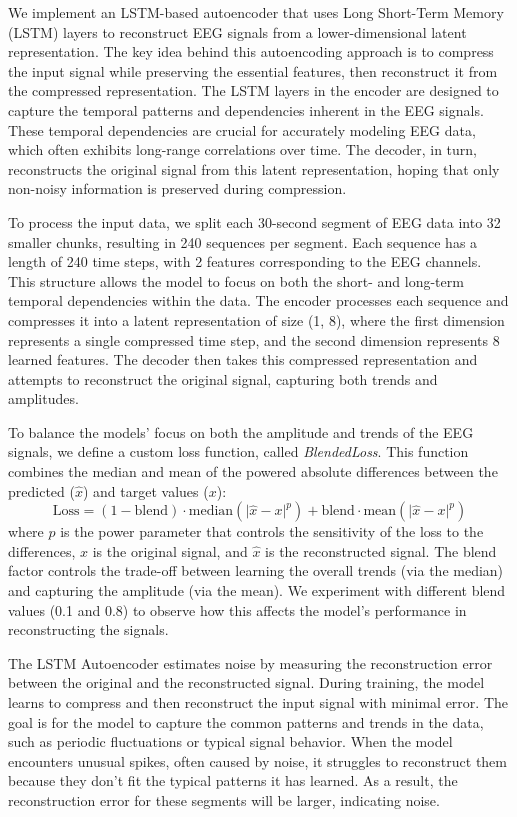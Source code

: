 We implement an LSTM-based autoencoder that uses Long Short-Term Memory (LSTM) layers to reconstruct EEG signals from a lower-dimensional latent representation. The key idea behind this autoencoding approach is to compress the input signal while preserving the essential features, then reconstruct it from the compressed representation. The LSTM layers in the encoder are designed to capture the temporal patterns and dependencies inherent in the EEG signals. These temporal dependencies are crucial for accurately modeling EEG data, which often exhibits long-range correlations over time. The decoder, in turn, reconstructs the original signal from this latent representation, hoping that only non-noisy information is preserved during compression.

To process the input data, we split each 30-second segment of EEG data into 32 smaller chunks, resulting in 240 sequences per segment. Each sequence has a length of 240 time steps, with 2 features corresponding to the EEG channels. This structure allows the model to focus on both the short- and long-term temporal dependencies within the data. The encoder processes each sequence and compresses it into a latent representation of size (1, 8), where the first dimension represents a single compressed time step, and the second dimension represents 8 learned features. The decoder then takes this compressed representation and attempts to reconstruct the original signal, capturing both trends and amplitudes.

To balance the models' focus on both the amplitude and trends of the EEG signals, we define a custom loss function, called \emph{BlendedLoss}. This function combines the median and mean of the powered absolute differences between the predicted ($\hat{x}$) and target values ($x$):
%
\begin{equation}
\text{Loss} = (1 - \text{blend}) \cdot \text{median}(\lvert \hat{x} - x \rvert^p) + \text{blend} \cdot \text{mean}(\lvert \hat{x} - x \rvert^p)
\label{eq:blended_loss}
\end{equation}
%
where $p$ is the power parameter that controls the sensitivity of the loss to the differences, $x$ is the original signal, and $\hat{x}$ is the reconstructed signal. The blend factor controls the trade-off between learning the overall trends (via the median) and capturing the amplitude (via the mean). We experiment with different blend values (0.1 and 0.8) to observe how this affects the model’s performance in reconstructing the signals.

The LSTM Autoencoder estimates noise by measuring the reconstruction error between the original and the reconstructed signal. During training, the model learns to compress and then reconstruct the input signal with minimal error. The goal is for the model to capture the common patterns and trends in the data, such as periodic fluctuations or typical signal behavior. When the model encounters unusual spikes, often caused by noise, it struggles to reconstruct them because they don't fit the typical patterns it has learned. As a result, the reconstruction error for these segments will be larger, indicating noise.

